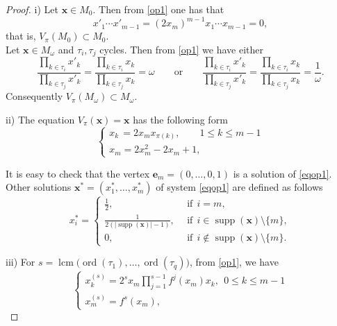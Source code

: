 \documentclass[11pt,reqno]{amsart}
\numberwithin{equation}{section} \setcounter{tocdepth}{1}
\DeclareMathOperator{\lcm}{lcm}
\DeclareMathOperator{\supp}{supp}
\DeclareMathOperator{\ord}{ord}
\begin{document}
\begin{proof} i) Let $\mathbf{x} \in M_0$. Then from \eqref{op1} one has that
\[x'_1\cdots x'_{m-1} = (2x_m)^{m-1} x_{1}\cdots x_{m-1}=0,\]
that is, $V_\pi(M_0)\subset M_0$.\\

Let $\mathbf{x} \in M_\omega$ and $\tau_i,\tau_j$  cycles. Then from \eqref{op1} we have either
\[\frac{\prod\limits_{k\in \tau_i} x'_{k}}{ \prod\limits_{k\in \tau_j} x'_{k}}=
\frac{\prod\limits_{k\in \tau_i} x_{k}}{ \prod\limits_{k\in \tau_j} x_{k}}=\omega \qquad \text{or} \qquad \frac{\prod\limits_{k\in \tau_i} x'_{k}}{ \prod\limits_{k\in \tau_j} x'_{k}}=
\frac{\prod\limits_{k\in \tau_i} x_{k}}{ \prod\limits_{k\in \tau_j} x_{k}}=\frac{1}{\omega}. \]
Consequently  $V_\pi(M_\omega)\subset M_\omega$.

ii) The equation  $V_\pi(\mathbf{x})=\mathbf{x}$ has the following form
\begin{equation}\label{eqop1}
\left\{\begin{array}{llllll}
                x_{k}\,= 2x_mx_{\pi(k)}, \qquad 1\leq k\leq m-1\\[2mm]
                x_{m}= 2x^2_m-2x_m+1,
\end{array}\right.
\end{equation}

It is easy to check that the vertex $\mathbf{e}_m=(0,\dots,0,1)$  is a solution of \eqref{eqop1}.
Other solutions $\mathbf{x}^*=(x_1^*,\dots,x_m^*)$ of  system \eqref{eqop1} are defined as follows
\[ x^*_i =\begin{cases}
\frac{1}{ 2},& \ \ \text{if} \ \ i=m,\\
\frac{1}{ 2(|\supp (\mathbf{x})|-1)},& \ \ \text{if} \ \ i\in \supp (\mathbf{x})\setminus \{m\},\\
0, & \ \ \text{if} \ \ i\notin \supp (\mathbf{x})\setminus \{m\}.
\end{cases}\]


iii)  For $s=\lcm \big(\ord (\tau_1),\dots, \ord (\tau_q)\big)$, from \eqref{op1}, we have
\begin{equation*}
 \left\{\begin{array}{ll}
               x^{(s)}_{k}=2^s x_m\prod\limits_{j=1}^{s-1} f^j(x_m) x_{k}, \ \ 0\leq k\leq m-1  \\[2mm]
              x^{(s)}_{m}= f^s(x_m),
\end{array}\right.
\end{equation*}


\end{proof}
\end{document}
